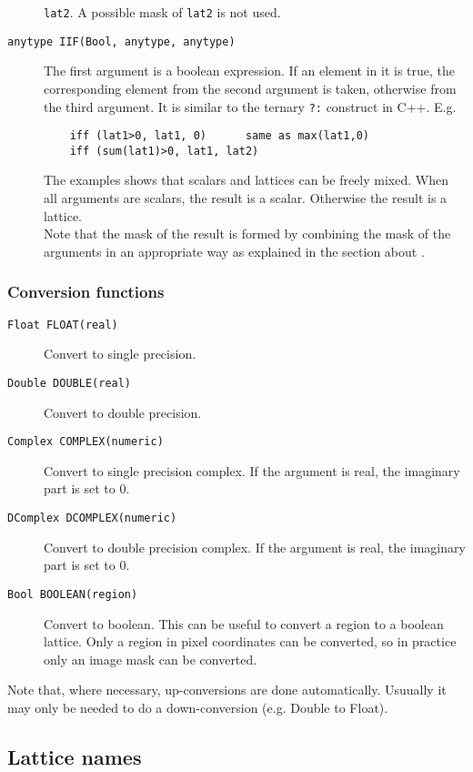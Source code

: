 \begin{description}
    \texttt{lat2}. A possible mask of \texttt{lat2} is not used.
  \item[ \texttt{anytype IIF(Bool, anytype, anytype)}]
    The first argument is a boolean expression. If an element in
    it is true, the corresponding element from the second argument is
    taken, otherwise from the third argument. It is similar to the
    ternary \texttt{?:} construct in C++. E.g.
    \begin{verbatim}
    iff (lat1>0, lat1, 0)      same as max(lat1,0)
    iff (sum(lat1)>0, lat1, lat2)
    \end{verbatim}
    The examples shows that scalars and lattices can be freely mixed.
    When all arguments are scalars, the result is a scalar. Otherwise
    the result is a lattice.
    \\ Note that the mask of the result is formed by combining the
    mask of the arguments in an appropriate way as explained in the
    section about .
\end{description}

\subsubsection{Conversion functions}
\begin{description}
  \item[ \texttt{Float FLOAT(real)}]
    Convert to single precision.
  \item[ \texttt{Double DOUBLE(real)}]
    Convert to double precision.
  \item[ \texttt{Complex COMPLEX(numeric)}]
    Convert to single precision complex.
    If the argument is real, the imaginary part is set to 0.
  \item[ \texttt{DComplex DCOMPLEX(numeric)}]
    Convert to double precision complex.
    If the argument is real, the imaginary part is set to 0.
  \item[ \texttt{Bool BOOLEAN(region)}]
    Convert to boolean.
    This can be useful to convert a region to a boolean lattice.
    Only a region in pixel coordinates can be converted, so in
    practice only an image mask can be converted.
\end{description}
Note that, where necessary, up-conversions are done automatically.
Usuually it may only be needed to do a down-conversion (e.g. Double to Float).

\subsection{\label{LEL:LATTICES}Lattice names}

